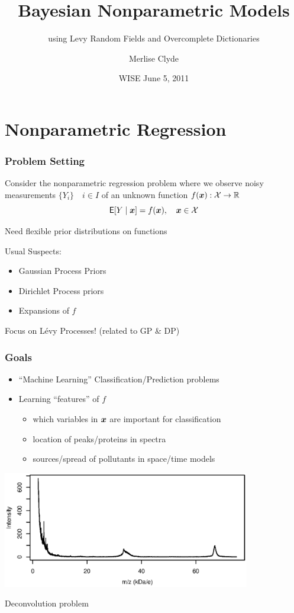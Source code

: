 \documentclass[dvips]{beamer}
\title{Bayesian Nonparametric Models}
\subtitle{\Large  using Levy Random Fields and Overcomplete Dictionaries}
\author[M. Clyde]{Merlise Clyde}
\institute{Department of Statistical Science \\ Duke
University }
\date{WISE June 5, 2011}
\newcommand{\bs}[2]{\begin{frame} \frametitle{#1} 
{#2}
\end{frame} }
\begin{document}
\begin{frame}
  \titlepage
\end{frame}


\section{Nonparametric Regression}
\bs{Problem Setting}{
Consider the nonparametric regression problem where we observe
noisy measurements  $\{Y_i\} \quad i \in  I $ of an
unknown function $f(\bm x): \mathcal{X} \to \mathbb{R}$
$$ {\sf{E}}[Y \mid \bm x] = f(\bm x), \quad \bm x \in \mathcal{X}$$


Need flexible prior distributions on functions 


Usual Suspects: 
\begin{itemize}
\item  Gaussian Process Priors
\item  Dirichlet Process priors
\item  Expansions of $f$  
\end{itemize}


\vfill

Focus on L\'evy Processes!  (related to GP \& DP)
}

\bs{Goals} {
  \begin{itemize}
  \item ``Machine Learning'' Classification/Prediction problems
  \item Learning ``features'' of $f$ 
    \begin{itemize}
    \item  which variables in $\bm x$ are
      important for classification
    \item location of peaks/proteins in spectra
    \item sources/spread of pollutants in space/time models
    \end{itemize}
  \end{itemize}

\vspace{-.25in}
\centerline{  \includegraphics[height=2in]{mean-spectrum.ps}}

\vspace{-.25in}
Deconvolution problem 
}
\end{document}

